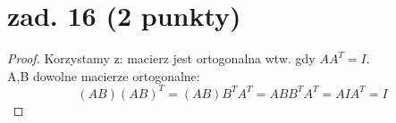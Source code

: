 \documentclass{article}
\begin{document}
\section{zad. 16 (2 punkty)}
\begin{proof}
Korzystamy z: macierz jest ortogonalna wtw. gdy $AA^T = I$.\\
A,B dowolne macierze ortogonalne:
$$
(AB)(AB)^T = (AB)B^TA^T = ABB^TA^T = AIA^T = I
$$
\end{proof}
\end{document}
